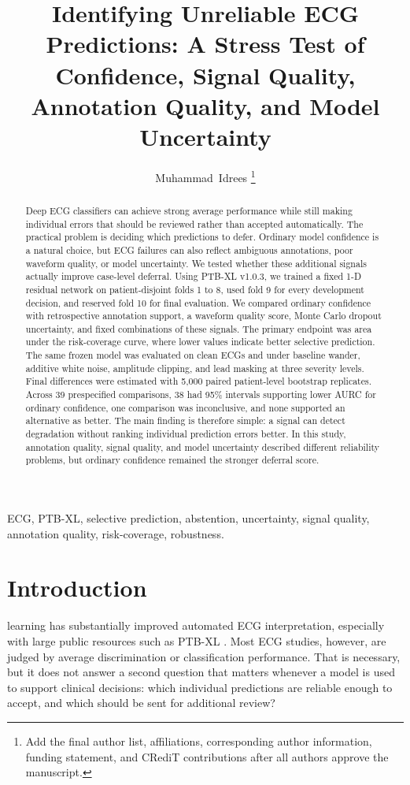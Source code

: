 \documentclass[journal]{IEEEtran}
\title{Identifying Unreliable ECG Predictions: A Stress Test of Confidence, Signal Quality, Annotation Quality, and Model Uncertainty}
\author{Muhammad~Idrees%
\thanks{Add the final author list, affiliations, corresponding author information, funding statement, and CRediT contributions after all authors approve the manuscript.}}
\newcommand{\BootstrapReps}{5,000}
\newcommand{\BootstrapTotal}{39}
\newcommand{\BootstrapConfidenceBetter}{38}
\begin{document}
\maketitle

\begin{abstract}
Deep ECG classifiers can achieve strong average performance while still making individual errors that should be reviewed rather than accepted automatically. The practical problem is deciding which predictions to defer. Ordinary model confidence is a natural choice, but ECG failures can also reflect ambiguous annotations, poor waveform quality, or model uncertainty. We tested whether these additional signals actually improve case-level deferral. Using PTB-XL v1.0.3, we trained a fixed 1-D residual network on patient-disjoint folds 1 to 8, used fold 9 for every development decision, and reserved fold 10 for final evaluation. We compared ordinary confidence with retrospective annotation support, a waveform quality score, Monte Carlo dropout uncertainty, and fixed combinations of these signals. The primary endpoint was area under the risk-coverage curve, where lower values indicate better selective prediction. The same frozen model was evaluated on clean ECGs and under baseline wander, additive white noise, amplitude clipping, and lead masking at three severity levels. Final differences were estimated with \BootstrapReps{} paired patient-level bootstrap replicates. Across \BootstrapTotal{} prespecified comparisons, \BootstrapConfidenceBetter{} had 95\% intervals supporting lower AURC for ordinary confidence, one comparison was inconclusive, and none supported an alternative as better. The main finding is therefore simple: a signal can detect degradation without ranking individual prediction errors better. In this study, annotation quality, signal quality, and model uncertainty described different reliability problems, but ordinary confidence remained the stronger deferral score.
\end{abstract}

\begin{IEEEkeywords}
ECG, PTB-XL, selective prediction, abstention, uncertainty, signal quality, annotation quality, risk-coverage, robustness.
\end{IEEEkeywords}

\section{Introduction}
 learning has substantially improved automated ECG interpretation, especially with large public resources such as PTB-XL \cite{wagner2020ptbxl,strodthoff2021ptbxl}. Most ECG studies, however, are judged by average discrimination or classification performance. That is necessary, but it does not answer a second question that matters whenever a model is used to support clinical decisions: which individual predictions are reliable enough to accept, and which should be sent for additional review?
\end{document}
